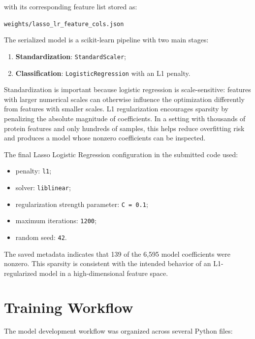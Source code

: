 \documentclass[11pt]{article}
\begin{document}
with its corresponding feature list stored as:

\begin{center}
\texttt{weights/lasso\_lr\_feature\_cols.json}
\end{center}

The serialized model is a scikit-learn pipeline with two main stages:

\begin{enumerate}
    \item \textbf{Standardization}: \texttt{StandardScaler};
    \item \textbf{Classification}: \texttt{LogisticRegression} with an L1 penalty.
\end{enumerate}

Standardization is important because logistic regression is scale-sensitive: features with larger numerical scales can otherwise influence the optimization differently from features with smaller scales. L1 regularization encourages sparsity by penalizing the absolute magnitude of coefficients. In a setting with thousands of protein features and only hundreds of samples, this helps reduce overfitting risk and produces a model whose nonzero coefficients can be inspected.


The final Lasso Logistic Regression configuration in the submitted code used:

\begin{itemize}
    \item penalty: \texttt{l1};
    \item solver: \texttt{liblinear};
    \item regularization strength parameter: \texttt{C = 0.1};
    \item maximum iterations: \texttt{1200};
    \item random seed: \texttt{42}.
\end{itemize}


The saved metadata indicates that 139 of the 6,595 model coefficients were nonzero. This sparsity is consistent with the intended behavior of an L1-regularized model in a high-dimensional feature space.

\section{Training Workflow}

The model development workflow was organized across several Python files:
\end{document}
